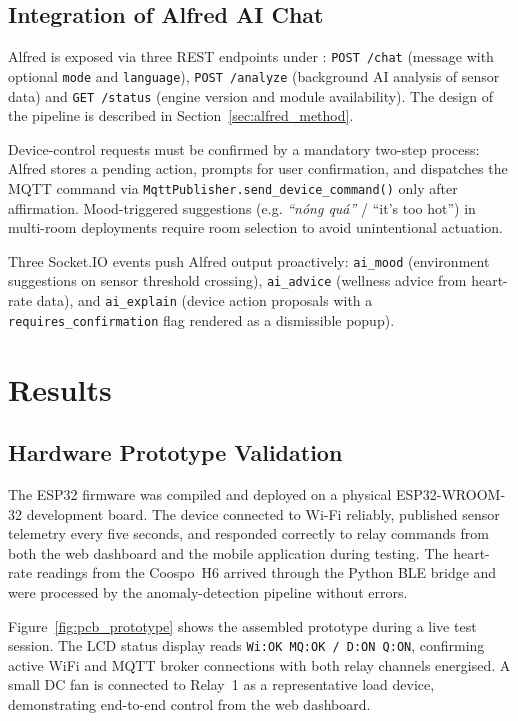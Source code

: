 \subsection{Integration of Alfred AI Chat} \label{subsec:alfred_impl}

Alfred is exposed via three REST endpoints under : 
\texttt{POST /chat} (message with optional \texttt{mode} and \texttt{language}), \texttt{POST /analyze} (background AI analysis of sensor data) and \texttt{GET /status} (engine version and module availability). The design of the pipeline is described in Section~\ref{sec:alfred_method}.

Device-control requests must be confirmed by a mandatory two-step process: Alfred stores a pending action, prompts for user confirmation, and dispatches the MQTT command via \texttt{MqttPublisher.send\_device\_command()} only after affirmation. Mood-triggered suggestions (e.g. \textit{``nóng quá''} / ``it's too hot'') in multi-room deployments require room selection to avoid unintentional actuation.

Three Socket.IO events push Alfred output proactively: \texttt{ai\_mood} (environment suggestions on sensor threshold crossing), \texttt{ai\_advice} (wellness advice from heart-rate data), and \texttt{ai\_explain} (device action proposals with a \texttt{requires\_confirmation} flag rendered as a dismissible popup).

\FloatBarrier


\section{Results}
\label{sec:results}

\subsection{Hardware Prototype Validation}

The ESP32 firmware was compiled and deployed on a physical ESP32-WROOM-32 development board. The device connected to Wi-Fi reliably, published sensor telemetry every five seconds, and responded correctly to relay commands from both the web dashboard and the mobile application during testing.
The heart-rate readings from the Coospo~H6 arrived through the Python BLE bridge and were processed by the anomaly-detection pipeline without errors.

Figure~\ref{fig:pcb_prototype} shows the assembled prototype during a live
test session. The LCD status display reads \texttt{Wi:OK MQ:OK / D:ON Q:ON},
confirming active WiFi and MQTT broker connections with both relay channels
energised. A small DC fan is connected to Relay~1 as a representative
load device, demonstrating end-to-end control from the web dashboard.

